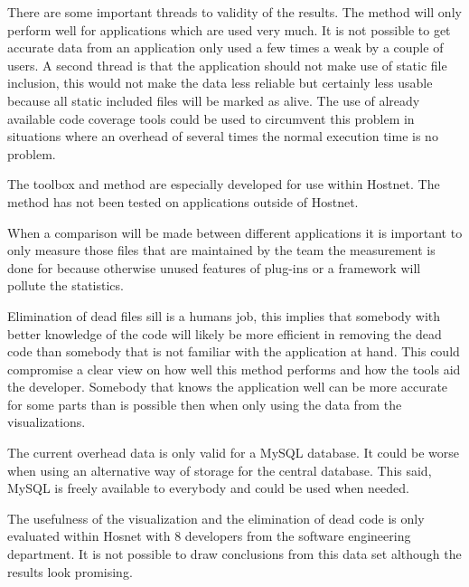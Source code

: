 There are some important threads to validity of the results. The method will only perform well for applications which are used very much. It is not possible to get accurate data from an application only used a few times a weak by a couple of users. A second thread is that the application should not make use of static file inclusion, this would not make the data less reliable but certainly less usable because all static included files will be marked as alive. The use of already available code coverage tools could be used to circumvent this problem in situations where an overhead of several times the normal execution time is no problem.

The toolbox and method are especially developed for use within Hostnet. The method has not been tested on applications outside of Hostnet.

When a comparison will be made between different applications it is important to only measure those files that are maintained by the team the measurement is done for because otherwise unused features of plug-ins or a framework will pollute the statistics.

Elimination of dead files sill is a humans job, this implies that somebody with better knowledge of the code will likely be more efficient in removing the dead code than somebody that is not familiar with the application at hand. This could compromise a clear view on how well this method performs and how the tools aid the developer. Somebody that knows the application well can be more accurate for some parts than is possible then when only using the data from the visualizations.

The current overhead data is only valid for a MySQL database. It could be worse when using an alternative way of storage for the central database. This said, MySQL is freely available to everybody and could be used when needed.

The usefulness of the visualization and the elimination of dead code is only evaluated within Hosnet with 8 developers from the software engineering department. It is not possible to draw conclusions from this data set although the results look promising.